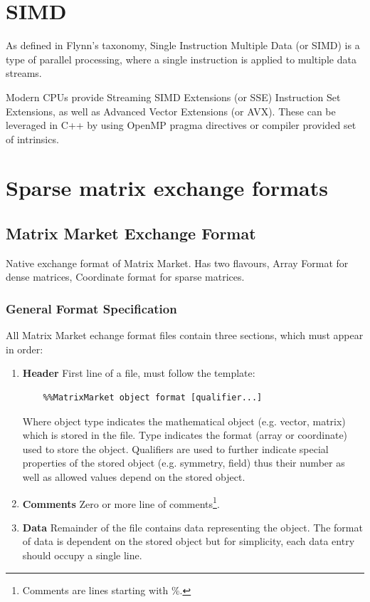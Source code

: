 \documentclass[thesis=M,english]{FITthesis}[2019/12/23]
\begin{document}
\section{SIMD}

As defined in Flynn's taxonomy, Single Instruction Multiple Data (or SIMD) is a type of parallel
processing, where a single instruction is applied to multiple data streams.

Modern CPUs provide Streaming SIMD Extensions (or SSE) Instruction Set Extensions, as well as
Advanced Vector Extensions (or AVX). These can be leveraged in C++ by using OpenMP pragma
directives or compiler provided set of intrinsics.



\section{Sparse matrix exchange formats}


\subsection{Matrix Market Exchange Format}

Native exchange format of Matrix Market. Has two flavours, Array Format for dense matrices,
Coordinate format for sparse matrices. \cite{mmef}


\subsubsection{General Format Specification}

All Matrix Market echange format files contain three sections, which must appear in order:

\begin{enumerate}
    \item \textbf{Header} First line of a file, must follow the template:
          \begin{lstlisting}
    %%MatrixMarket object format [qualifier...]
\end{lstlisting}
          Where object type indicates the mathematical object (e.g. vector, matrix) which is
          stored in the file. Type indicates the format (array or coordinate) used to store
          the object. Qualifiers are used to further indicate special properties of the stored
          object (e.g. symmetry, field) thus their number as well as allowed values depend on
          the stored object.
    \item \textbf{Comments} Zero or more line of comments\footnote{Comments are lines starting with \%.}.
    \item \textbf{Data} Remainder of the file contains data representing the object.
          The format of data is dependent on the stored object but for simplicity,
          each data entry should occupy a single line.
\end{enumerate}
\end{document}
